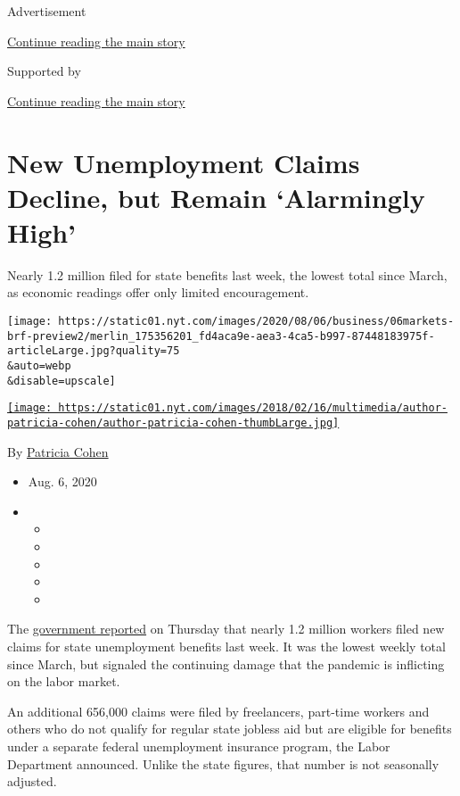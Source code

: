 Advertisement

\protect\hyperlink{after-top}{Continue reading the main story}

Supported by

\protect\hyperlink{after-sponsor}{Continue reading the main story}

\hypertarget{new-unemployment-claims-decline-but-remain-alarmingly-high}{%
\section{New Unemployment Claims Decline, but Remain `Alarmingly
High'}\label{new-unemployment-claims-decline-but-remain-alarmingly-high}}

Nearly 1.2 million filed for state benefits last week, the lowest total
since March, as economic readings offer only limited encouragement.

\texttt{[image: https://static01.nyt.com/images/2020/08/06/business/06markets-brf-preview2/merlin\_175356201\_fd4aca9e-aea3-4ca5-b997-87448183975f-articleLarge.jpg?quality=75\\\&auto=webp\\\&disable=upscale]}

\href{https://www.nytimes.com/by/patricia-cohen}{\texttt{[image: https://static01.nyt.com/images/2018/02/16/multimedia/author-patricia-cohen/author-patricia-cohen-thumbLarge.jpg]}}

By \href{https://www.nytimes.com/by/patricia-cohen}{Patricia Cohen}

\begin{itemize}
\item
  Aug. 6, 2020
\item
  \begin{itemize}
  \item
  \item
  \item
  \item
  \item
  \end{itemize}
\end{itemize}

The \href{https://oui.doleta.gov/press/2020/080620.pdf}{government
reported} on Thursday that nearly 1.2 million workers filed new claims
for state unemployment benefits last week. It was the lowest weekly
total since March, but signaled the continuing damage that the pandemic
is inflicting on the labor market.

An additional 656,000 claims were filed by freelancers, part-time
workers and others who do not qualify for regular state jobless aid but
are eligible for benefits under a separate federal unemployment
insurance program, the Labor Department announced. Unlike the state
figures, that number is not seasonally adjusted.

